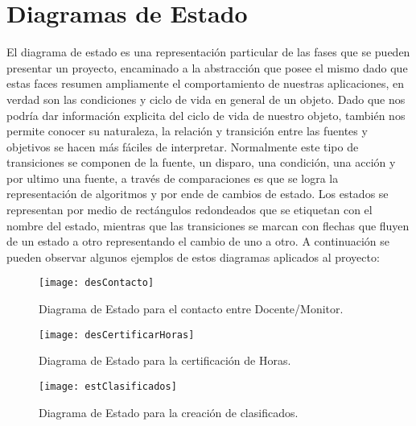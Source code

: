 \section{Diagramas de Estado}
El diagrama de estado es una representación particular de las fases que se pueden presentar un proyecto, encaminado a la abstracción que posee el mismo dado que estas faces resumen ampliamente el comportamiento de nuestras aplicaciones, en verdad son las condiciones y ciclo de vida en general de un objeto. 
Dado que nos podría dar información explicita del ciclo de vida de nuestro objeto, también nos permite conocer su naturaleza, la relación y transición entre las fuentes y objetivos se hacen más fáciles de interpretar.
Normalmente este tipo de transiciones se componen de la fuente, un disparo, una condición, una acción y por ultimo una fuente, a través de comparaciones es que se logra la representación de algoritmos y por ende de cambios de estado.  
Los estados se representan por medio de rectángulos redondeados que se etiquetan con el nombre del estado, mientras que las transiciones se marcan con flechas que fluyen de un estado a otro representando el cambio de uno a otro. A continuación se pueden observar algunos ejemplos de estos diagramas aplicados al proyecto:
\begin{figure}[H]
	\centering
	\texttt{[image: desContacto]}
	\centering
	\caption{Diagrama de Estado para el contacto entre Docente/Monitor.}
	\label{fig:desContacto}
\end{figure}
\clearpage
\begin{figure}[H]
	\centering
	\texttt{[image: desCertificarHoras]}
	\centering
	\caption{Diagrama de Estado para la certificación de Horas.}
	\label{fig:desCertificarHoras}
\end{figure}

\begin{figure}[H]
	\centering
	\texttt{[image: estClasificados]}
	\centering
	\caption{Diagrama de Estado para la creación de clasificados.}
	\label{fig:desClasificados}
\end{figure}
